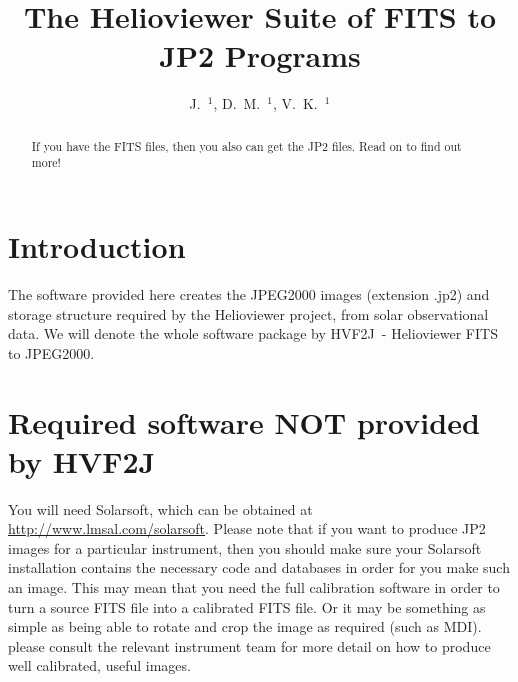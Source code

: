 \documentclass[namedreferences]{SolarPhysics}
\newcommand{\sname}{HVF2J}
\begin{document}
\begin{article}

\begin{opening}

\title{The Helioviewer Suite of FITS to JP2 Programs}

\author{J.~$^{1}$\sep
        D.~M.~$^{1}$\sep
        V.~K.~$^{1}$      
       }
\runningtitle{Helioviewer: FITS 2 JP2 - \sname}


\begin{abstract}
If you have the FITS files, then you also can get the JP2 files.  Read
on to find out more!
\end{abstract}
\end{opening}

\section{Introduction}
The software provided here creates the JPEG2000 images (extension .jp2)
and storage structure required by the Helioviewer project, from solar
observational data.  We will denote the whole software package by
\sname\ - Helioviewer FITS to JPEG2000.


\section{Required software NOT provided by \sname}\label{sec:req}

You will need Solarsoft, which can be obtained at
\url{http://www.lmsal.com/solarsoft}.  Please note that if you want to
produce JP2 images for a particular instrument, then you should make
sure your Solarsoft installation contains the necessary code and
databases in order for you make such an image.  This may mean that you
need the full calibration software in order to turn a source FITS file
into a calibrated FITS file.  Or it may be something as simple as
being able to rotate and crop the image as required (such as MDI).
please consult the relevant instrument team for more detail on how to
produce well calibrated, useful images.


\end{article}
\end{document}
